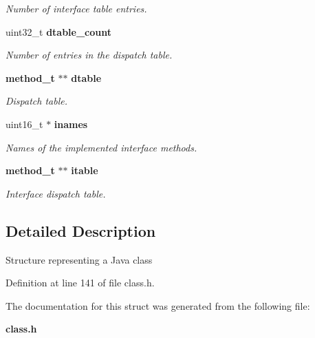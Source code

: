 \begin{DoxyCompactItemize}
\begin{DoxyCompactList}\small\item\em Number of interface table entries. \item\end{DoxyCompactList}\item 
uint32\_\-t {\bf dtable\_\-count}\label{structclass__t_a5acbab45a6e69d4293539457de6ee7e4}

\begin{DoxyCompactList}\small\item\em Number of entries in the dispatch table. \item\end{DoxyCompactList}\item 
{\bf method\_\-t} $\ast$$\ast$ {\bf dtable}\label{structclass__t_a8953de31aa23f9094674fe7fc4a2880d}

\begin{DoxyCompactList}\small\item\em Dispatch table. \item\end{DoxyCompactList}\item 
uint16\_\-t $\ast$ {\bf inames}\label{structclass__t_a231898abddebf7391ca6bbbe6f814fb2}

\begin{DoxyCompactList}\small\item\em Names of the implemented interface methods. \item\end{DoxyCompactList}\item 
{\bf method\_\-t} $\ast$$\ast$ {\bf itable}\label{structclass__t_a5b0fccfd7694b88ca76cebb1fe5e0545}

\begin{DoxyCompactList}\small\item\em Interface dispatch table. \item\end{DoxyCompactList}\end{DoxyCompactItemize}


\subsection{Detailed Description}
Structure representing a Java class 

Definition at line 141 of file class.h.



The documentation for this struct was generated from the following file:\begin{DoxyCompactItemize}
\item 
{\bf class.h}\end{DoxyCompactItemize}
